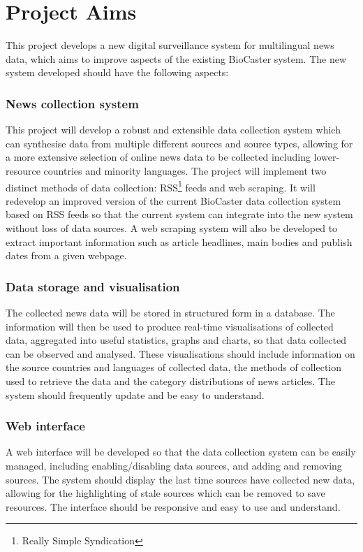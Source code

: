 \documentclass{l4proj}
\begin{document}
\section{Project Aims}
This project develops a new digital surveillance system for multilingual news data, which aims to improve aspects of the existing BioCaster system. The new system developed should have the following aspects: 

\subsubsection{News collection system}
This project will develop a robust and extensible data collection system which can synthesise data from multiple different sources and source types, allowing for a more extensive selection of online news data to be collected including lower-resource countries and minority languages. The project will implement two distinct methods of data collection: RSS\footnote{Really Simple Syndication} feeds and web scraping. It will redevelop an improved version of the current BioCaster data collection system based on RSS feeds so that the current system can integrate into the new system without loss of data sources. A web scraping system will also be developed to extract important information such as article headlines, main bodies and publish dates from a given webpage.
\subsubsection{Data storage and visualisation} The collected news data will be stored in structured form in a database. The information will then be used to produce real-time visualisations of collected data, aggregated into useful statistics, graphs and charts, so that data collected can be observed and analysed. These visualisations should include information on the source countries and languages of collected data, the methods of collection used to retrieve the data and the category distributions of news articles. The system should frequently update and be easy to understand.
\subsubsection{Web interface} A web interface will be developed so that the data collection system can be easily managed, including enabling/disabling data sources, and adding and removing sources. The system should display the last time sources have collected new data, allowing for the highlighting of stale sources which can be removed to save resources. The interface should be responsive and easy to use and understand.
\end{document}
